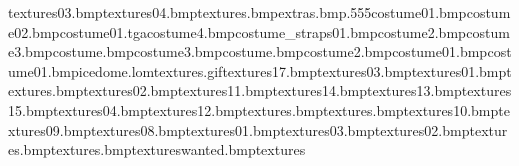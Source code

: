 textures\snowindow03.bmp textures\snowindow04.bmp textures\rocketstripes.bmp extras\map.bmp.555 costume\snowboardhat01.bmp costume\snowboardhat02.bmp costume\crashhelmetvisor01.tga costume\tongueline4.bmp costume\safaripack_straps01.bmp costume\bodyeyebrow2.bmp costume\eyetex3.bmp costume\muzzlestubble.bmp costume\bodytoes3.bmp costume\noseshine.bmp costume\earslined2.bmp costume\snowboardboard01.bmp costume\snowboardvisor01.bmp icedome.lom textures\subunkradar.gif textures\snowboard17.bmp textures\rocketsilo03.bmp textures\rocketsilo01.bmp textures\rocketlogo.bmp textures\rocketsilo02.bmp textures\subunk11.bmp textures\subunk14.bmp textures\subunk13.bmp textures\subunk15.bmp textures\spookycpu04.bmp textures\subunk12.bmp textures\wires.bmp textures\flash.bmp textures\subunk10.bmp textures\subunk09.bmp textures\subunk08.bmp textures\snowsub01.bmp textures\snowsub03.bmp textures\snowsub02.bmp textures\elecloop.bmp textures\bandaid.bmp textures\icetreetaz wanted.bmp textures\icetaz 